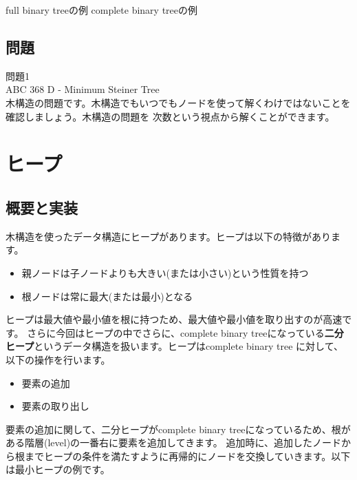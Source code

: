 \documentclass{jlreq}
\begin{document}
\hspace{1.5cm} full binary treeの例 \hspace{4.5cm} complete binary treeの例

\subsection{問題}
問題1 \\
ABC 368 D - Minimum Steiner Tree \\
木構造の問題です。木構造でもいつでもノードを使って解くわけではないことを確認しましょう。木構造の問題を
次数という視点から解くことができます。\\

\newpage

\section{ヒープ}
\subsection{概要と実装}
木構造を使ったデータ構造にヒープがあります。ヒープは以下の特徴があります。

\begin{itemize}
	\item 親ノードは子ノードよりも大きい(または小さい)という性質を持つ
	\item 根ノードは常に最大(または最小)となる
\end{itemize}

ヒープは最大値や最小値を根に持つため、最大値や最小値を取り出すのが高速です。
さらに今回はヒープの中でさらに、complete binary treeになっている\textbf{二分ヒープ}というデータ構造を扱います。ヒープはcomplete binary tree
に対して、以下の操作を行います。

\begin{itemize}
	\item 要素の追加
	\item 要素の取り出し
\end{itemize}

要素の追加に関して、二分ヒープがcomplete binary treeになっているため、根がある階層(level)の一番右に要素を追加してきます。
追加時に、追加したノードから根までヒープの条件を満たすように再帰的にノードを交換していきます。以下は最小ヒープの例です。
\end{document}
